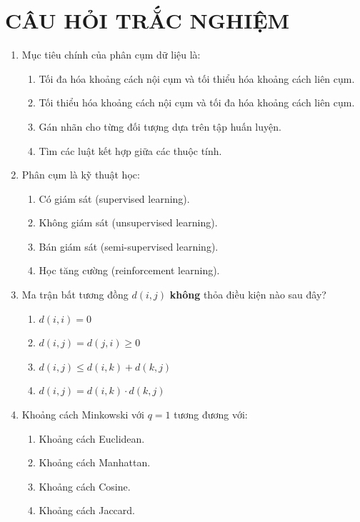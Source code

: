 \documentclass[10pt]{article}
\begin{document}
\newpage
\section{CÂU HỎI TRẮC NGHIỆM}

\begin{enumerate}[leftmargin=*, label=\textbf{Câu \arabic*.}]

    \item Mục tiêu chính của phân cụm dữ liệu là:
    \begin{enumerate}[label=\Alph*.]
        \item Tối đa hóa khoảng cách nội cụm và tối thiểu hóa khoảng cách liên cụm.
        \item Tối thiểu hóa khoảng cách nội cụm và tối đa hóa khoảng cách liên cụm.
        \item Gán nhãn cho từng đối tượng dựa trên tập huấn luyện.
        \item Tìm các luật kết hợp giữa các thuộc tính.
    \end{enumerate}

    \item Phân cụm là kỹ thuật học:
    \begin{enumerate}[label=\Alph*.]
        \item Có giám sát (supervised learning).
        \item Không giám sát (unsupervised learning).
        \item Bán giám sát (semi-supervised learning).
        \item Học tăng cường (reinforcement learning).
    \end{enumerate}

    \item Ma trận bất tương đồng $d(i,j)$ \textbf{không} thỏa điều kiện nào sau đây?
    \begin{enumerate}[label=\Alph*.]
        \item $d(i,i) = 0$
        \item $d(i,j) = d(j,i) \geq 0$
        \item $d(i,j) \leq d(i,k) + d(k,j)$
        \item $d(i,j) = d(i,k) \cdot d(k,j)$
    \end{enumerate}

    \item Khoảng cách Minkowski với $q=1$ tương đương với:
    \begin{enumerate}[label=\Alph*.]
        \item Khoảng cách Euclidean.
        \item Khoảng cách Manhattan.
        \item Khoảng cách Cosine.
        \item Khoảng cách Jaccard.
    \end{enumerate}


\end{enumerate}
\end{document}
